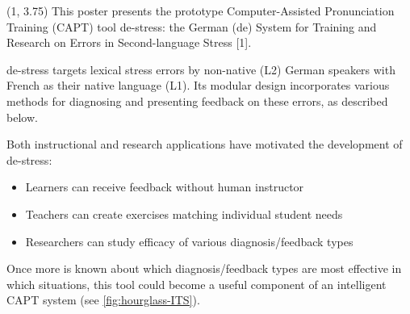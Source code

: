 \documentclass[a0,portrait]{a0poster}
\newcommand{\headingcolor}{\color{BannerSixColor}}
\def\Highlight#1{{\sffamily \headingcolor #1}}
\let\Textsize\Large
\begin{document}
 \begin{textblock}{7}(1, 3.75)
  \Textsize
This poster presents the prototype Computer-Assisted Pronunciation Training (CAPT) tool \Highlight{de-stress}: the German (\Highlight{de}) \Highlight{S}ystem for \Highlight{T}raining and \Highlight{R}esearch on \Highlight{E}rrors in \Highlight{S}econd-language \Highlight{S}tress [1].

\Highlight{de-stress} targets lexical stress errors by non-native (L2) German speakers with French as their native language (L1). Its modular design incorporates various methods for diagnosing and presenting feedback on these errors, as described below. 

Both instructional and research applications have motivated the development of \Highlight{de-stress}:

\begin{itemize}
\item{Learners can receive feedback without human instructor}
\item{Teachers can create exercises matching individual student needs}
\item{Researchers can study efficacy of various diagnosis/feedback types}
\end{itemize}

  

Once more is known about which diagnosis/feedback types are most effective in which situations, this tool could become a useful component of an intelligent CAPT system (see \cref{fig:hourglass-ITS}).




\end{textblock}
\end{document}
